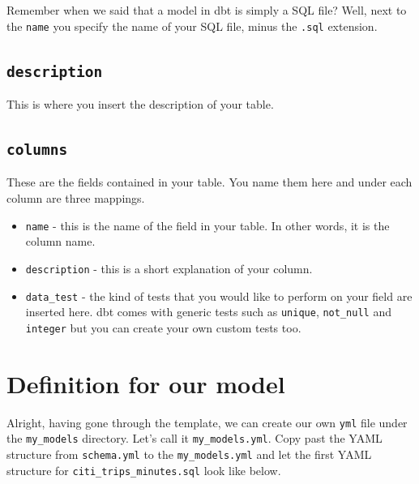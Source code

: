 \documentclass[
]{book}
\begin{document}
Remember when we said that a model in dbt is simply a SQL file? Well, next to the \texttt{name} you specify the name of your SQL file, minus the \texttt{.sql} extension.

\hypertarget{description}{%
\subsection{\texorpdfstring{\texttt{description}}{description}}\label{description}}

This is where you insert the description of your table.

\hypertarget{columns}{%
\subsection{\texorpdfstring{\texttt{columns}}{columns}}\label{columns}}

These are the fields contained in your table. You name them here and under each column are three mappings.

\begin{itemize}
\item
  \texttt{name} - this is the name of the field in your table. In other words, it is the column name.
\item
  \texttt{description} - this is a short explanation of your column.
\item
  \texttt{data\_test} - the kind of tests that you would like to perform on your field are inserted here. dbt comes with generic tests such as \texttt{unique}, \texttt{not\_null} and \texttt{integer} but you can create your own custom tests too.
\end{itemize}

\hypertarget{definition-for-our-model}{%
\section{Definition for our model}\label{definition-for-our-model}}

Alright, having gone through the template, we can create our own \texttt{yml} file under the \texttt{my\_models} directory. Let's call it \texttt{my\_models.yml}. Copy past the YAML structure from \texttt{schema.yml} to the \texttt{my\_models.yml} and let the first YAML structure for \texttt{citi\_trips\_minutes.sql} look like below.
\end{document}
